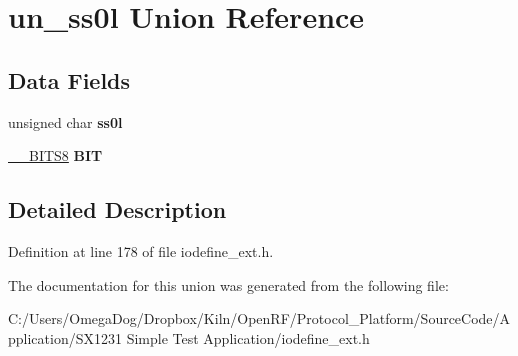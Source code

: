 \hypertarget{unionun__ss0l}{\section{un\-\_\-ss0l Union Reference}
\label{unionun__ss0l}
}
\subsection*{Data Fields}
\begin{DoxyCompactItemize}
\item 
\hypertarget{unionun__ss0l_a5d94960dc614ce38776007ec277cdb09}{unsigned char {\bfseries ss0l}}\label{unionun__ss0l_a5d94960dc614ce38776007ec277cdb09}

\item 
\hypertarget{unionun__ss0l_a27368120215c91a7f50d6ada0dae6644}{\hyperlink{struct_____b_i_t_s8}{\-\_\-\-\_\-\-B\-I\-T\-S8} {\bfseries B\-I\-T}}\label{unionun__ss0l_a27368120215c91a7f50d6ada0dae6644}

\end{DoxyCompactItemize}


\subsection{Detailed Description}


Definition at line 178 of file iodefine\-\_\-ext.\-h.



The documentation for this union was generated from the following file\-:\begin{DoxyCompactItemize}
\item 
C\-:/\-Users/\-Omega\-Dog/\-Dropbox/\-Kiln/\-Open\-R\-F/\-Protocol\-\_\-\-Platform/\-Source\-Code/\-Application/\-S\-X1231 Simple Test Application/iodefine\-\_\-ext.\-h\end{DoxyCompactItemize}
